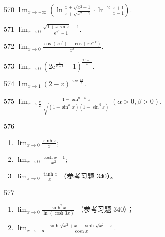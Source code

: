 \begin{prob}[S]{570}
$\displaystyle \lim_{x\to +\infty} \left(\ln\frac{x+\sqrt{x^2+1}}{x+\sqrt{x^2-1}}\cdot \ln^{-2}\frac{x+1}{x-1}\right).$
\end{prob}

\begin{prob}[S]{571}
$\displaystyle \lim_{x\to 0} \frac{\sqrt{1+x\sin x} - 1}{\mathrm{e}^{x^2} - 1}.$
\end{prob}

\begin{prob}[S]{572}
$\displaystyle \lim_{x\to 0} \frac{\cos(x\mathrm{e}^x) - \cos(x\mathrm{e}^{-x})}{x^3}.$
\end{prob}

\begin{prob}[S]{573}
$\displaystyle \lim_{x\to 0} \left(2\mathrm{e}^{\frac{x}{x+1}} - 1\right)^{\frac{x^2+1}{x}}.$
\end{prob}

\begin{prob}[S]{574}
$\displaystyle \lim_{x\to 1} (2-x)^{\sec\frac{\pi x}{2}}.$
\end{prob}

\begin{prob}[S]{575}
$\displaystyle \lim_{x\to \frac{\pi}{2}} \frac{1 - \sin^{\alpha+\beta} x}{\sqrt{(1-\sin^\alpha x)(1-\sin^\beta x)}} \ (\alpha > 0, \beta > 0).$
\end{prob}

\begin{prob}[L]{576}
\begin{enumerate}[label=(\alph*), itemsep=2pt, topsep=3pt]
  \item $\displaystyle \lim_{x\to 0} \frac{\sinh x}{x}$;
  \item $\displaystyle \lim_{x\to 0} \frac{\cosh x - 1}{x^2}$;
  \item $\displaystyle \lim_{x\to 0} \frac{\tanh x}{x}$ （参考习题 340）。
\end{enumerate}
\end{prob}

\begin{prob}[M]{577}
\begin{enumerate}[label=(\alph*), itemsep=2pt, topsep=3pt]
  \item $\displaystyle \lim_{x\to 0} \frac{\sinh^2 x}{\ln(\cosh 3x)}$ （参考习题 340）；
  \item $\displaystyle \lim_{x\to +\infty} \frac{\sinh\sqrt{x^2+x} - \sinh\sqrt{x^2-x}}{\cosh x}.$
\end{enumerate}
\end{prob}


